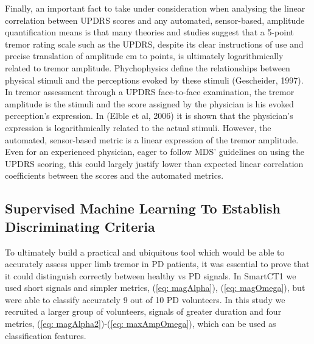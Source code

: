 Finally, an important fact to take under consideration when analysing the linear correlation between \gls{UPDRS} scores and any automated, sensor-based, amplitude quantification means is that many theories and studies suggest that a 5-point tremor rating scale such as the \gls{UPDRS}, despite its clear instructions of use and precise translation of amplitude cm to points, is ultimately logarithmically related to tremor amplitude. Phychophysics define the relationships between physical stimuli and the perceptions evoked by these stimuli (Gescheider, 1997). In tremor assessment through a \gls{UPDRS} face-to-face examination, the tremor amplitude is the stimuli and the score assigned by the physician is his evoked perception's expression. In (Elble et al, 2006) it is shown that the physician's expression is logarithmically related to the actual stimuli. However, the automated, sensor-based metric is a linear expression of the tremor amplitude. Even for an experienced physician, eager to follow \gls{MDS}' guidelines on using the \gls{UPDRS} scoring, this could largely justify lower than expected linear correlation coefficients between the scores and the automated metrics. 

\subsection{Supervised Machine Learning To Establish Discriminating Criteria}
\label{subsec:PenCTML}
To ultimately build a practical and ubiquitous tool which would be able to accurately assess upper limb tremor in \gls{PD} patients, it was essential to prove that it could distinguish correctly between healthy vs \gls{PD} signals. In \gls{SmartCT1} we used short signals and simpler metrics, (\ref{eq: magAlpha}), (\ref{eq: magOmega}), but were able to classify accurately 9 out of 10 \gls{PD} volunteers. In this study we recruited a larger group of volunteers, signals of greater duration and four metrics, (\ref{eq: magAlpha2})-(\ref{eq: maxAmpOmega}), which can be used as classification features. 


